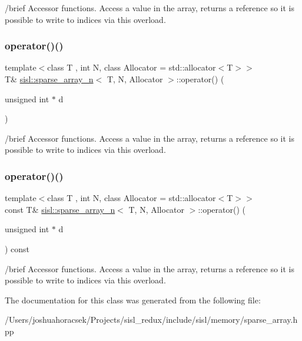 /brief Accessor functions. Access a value in the array, returns a reference so it is possible to write to indices via this overload. \mbox{\label{classsisl_1_1sparse__array__n_a21e3bb0965fa54371ad65e6c5cc10520}} 
\subsubsection{\texorpdfstring{operator()()}{operator()()}\hspace{0.1cm}{\footnotesize\ttfamily [3/4]}}
{\footnotesize\ttfamily template$<$class T , int N, class Allocator  = std\+::allocator$<$\+T$>$$>$ \\
T\& \hyperlink{classsisl_1_1sparse__array__n}{sisl\+::sparse\+\_\+array\+\_\+n}$<$ T, N, Allocator $>$\+::operator() (\begin{DoxyParamCaption}\item[{unsigned int $\ast$}]{d }\end{DoxyParamCaption})\hspace{0.3cm}{\ttfamily [inline]}}

/brief Accessor functions. Access a value in the array, returns a reference so it is possible to write to indices via this overload. \mbox{\label{classsisl_1_1sparse__array__n_ad7ab70c556272a847c076ff5f3a2ad26}} 
\subsubsection{\texorpdfstring{operator()()}{operator()()}\hspace{0.1cm}{\footnotesize\ttfamily [4/4]}}
{\footnotesize\ttfamily template$<$class T , int N, class Allocator  = std\+::allocator$<$\+T$>$$>$ \\
const T\& \hyperlink{classsisl_1_1sparse__array__n}{sisl\+::sparse\+\_\+array\+\_\+n}$<$ T, N, Allocator $>$\+::operator() (\begin{DoxyParamCaption}\item[{unsigned int $\ast$}]{d }\end{DoxyParamCaption}) const\hspace{0.3cm}{\ttfamily [inline]}}

/brief Accessor functions. Access a value in the array, returns a reference so it is possible to write to indices via this overload. 

The documentation for this class was generated from the following file\+:\begin{DoxyCompactItemize}
\item 
/\+Users/joshuahoracsek/\+Projects/sisl\+\_\+redux/include/sisl/memory/sparse\+\_\+array.\+hpp\end{DoxyCompactItemize}
